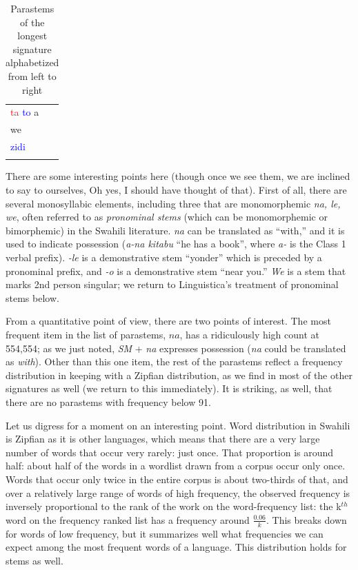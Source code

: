 \documentclass[output=paper,colorlinks,citecolor=brown]{langscibook}
\begin{document}
\begin{table}
\begin{minipage}{.24\textwidth}
\begin{tabular}{ll}
\textcolor{red}{ta} \textcolor{blue}{to} a   \\ 
we   \\
\textcolor{blue}{zidi}  \\ 
\lspbottomrule
\end{tabular}
\end{minipage}
\caption{Parastems of the longest signature alphabetized from left to right}
\label{stems-alphabetized-1}
\end{table} 
 


 


There are some interesting points here (though once we see them, we are inclined to say to ourselves, Oh yes, I should have thought of that). First of all, there are several monosyllabic elements, including three that are monomorphemic \textit{na, le, we}, often referred to as \textit{pronominal stems} (which can be monomorphemic or bimorphemic) in the Swahili literature. \textit{na} can be translated as ``with,'' and it is used to indicate possession (\textit{a-na kitabu} ``he has a book'', where \textit{a-} is the Class 1 verbal prefix). \textit{-le} is a demonstrative stem ``yonder'' which is preceded by a pronominal prefix,  and \textit{-o} is a demonstrative stem ``near you.'' \textit{We} is a stem that marks 2nd person singular; we return to Linguistica's treatment of pronominal stems below. 

From a quantitative point of view, there are two points of interest. The most frequent item in the list of parastems, $na$, has a ridiculously high count at 554,554; as we just noted, \textit{SM} + \textit{na} expresses possession (\textit{na} could be translated as \textit{with}). Other than this one item, the rest of the parastems reflect a frequency distribution in keeping with a Zipfian distribution, as we find in most of the other signatures as well (we return to this immediately). It is striking, as well, that there are no parastems with frequency below 91. 

Let us digress for a moment on an interesting point. Word distribution in Swahili is Zipfian as it is other languages, which means that there are a very large number of words that occur very rarely: just once. That proportion is around half: about half of the words in a wordlist drawn from a corpus occur only once. Words that occur only twice in the entire corpus is about two-thirds of that, and over a relatively large range of words of high frequency, the observed frequency is inversely proportional to the rank of the work on the word-frequency list: the k$^{th}$ word on the frequency ranked list has a frequency around $\frac{0.06}{k}$. This breaks down for words of low frequency, but it summarizes well what frequencies we can expect among the most frequent words of a language. This distribution holds for stems as well. 
\end{document}
